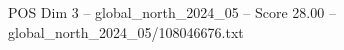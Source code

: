 \begin{textsample}{POS Dim 3 – global\_north\_2024\_05 – Score 28.00 – global\_north\_2024\_05/108046676.txt}
\end{textsample}
